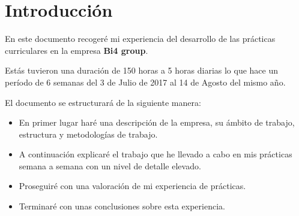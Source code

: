 \chapter{Introducción}

En este documento recogeré mi experiencia del desarrollo de las prácticas curriculares en la empresa \textbf{Bi4 group}. 

Estás tuvieron una duración de 150 horas a 5 horas diarias lo que hace un período de 6 semanas del 3 de Julio de 2017 al 14 de Agosto del mismo año.

El documento se estructurará de la siguiente manera:
\begin{itemize}
	\item En primer lugar haré una descripción de la empresa, su ámbito de trabajo, estructura y metodologías de trabajo.
	\item A continuación explicaré el trabajo que he llevado a cabo en mis prácticas semana a semana con un nivel de detalle elevado.
	\item Proseguiré con una valoración de mi experiencia de prácticas.
	\item Terminaré con unas conclusiones sobre esta experiencia.
\end{itemize}